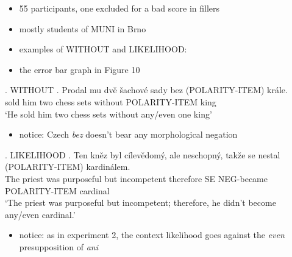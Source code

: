 \documentclass[
  ignorenonframetext,
]{beamer}
\providecommand{\tightlist}{%
  \setlength{\itemsep}{0pt}\setlength{\parskip}{0pt}}\usepackage{longtable,booktabs,array}
\newcommand{\cond}[1]{\textsc{#1}}
\begin{document}
\begin{frame}
\begin{itemize}
\tightlist
\item
  55 participants, one excluded for a bad score in fillers
\item
  mostly students of MUNI in Brno
\item
  examples of \cond{WITHOUT} and \cond{LIKELIHOOD}:
\item
  the error bar graph in Figure 10
\end{itemize}
\end{frame}

\begin{frame}
\ex. \cond{WITHOUT} \ag. Prodal mu dvě šachové sady bez (POLARITY-ITEM)
krále.\\
sold him two chess sets without POLARITY-ITEM king\\
`He sold him two chess sets without any/even one king'

\begin{itemize}
\tightlist
\item
  notice: Czech \emph{bez} doesn't bear any morphological negation
\end{itemize}
\end{frame}

\begin{frame}
\ex. \cond{LIKELIHOOD} \ag. Ten kněz byl cílevědomý, ale neschopný,
takže se nestal (POLARITY-ITEM) kardinálem.\\
The priest was purposeful but incompetent therefore SE NEG-became
POLARITY-ITEM cardinal\\
`The priest was purposeful but incompetent; therefore, he didn't become
any/even cardinal.'

\begin{itemize}
\tightlist
\item
  notice: as in experiment 2, the context likelihood goes against the
  \emph{even} presupposition of \emph{ani}
\end{itemize}
\end{frame}
\end{document}
